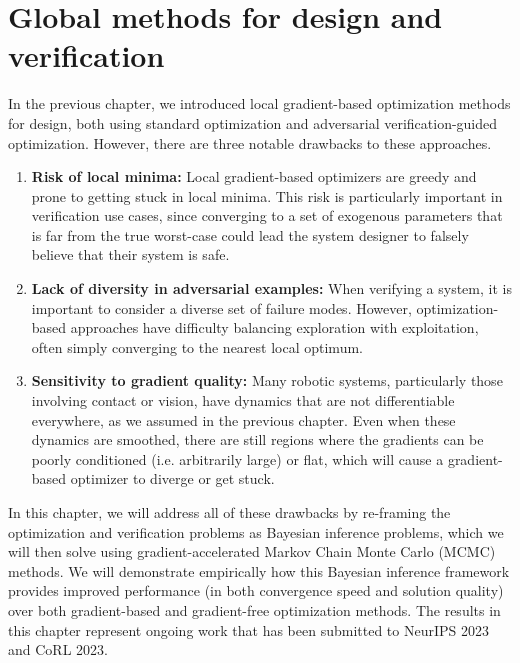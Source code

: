 \chapter{Global methods for design and verification}\label{section:global_methods}

In the previous chapter, we introduced local gradient-based optimization methods for design, both using standard optimization and adversarial verification-guided optimization. However, there are three notable drawbacks to these approaches.

\begin{enumerate}
    \item \textbf{Risk of local minima: } Local gradient-based optimizers are greedy and prone to getting stuck in local minima. This risk is particularly important in verification use cases, since converging to a set of exogenous parameters that is far from the true worst-case could lead the system designer to falsely believe that their system is safe.
    \item \textbf{Lack of diversity in adversarial examples: } When verifying a system, it is important to consider a diverse set of failure modes. However, optimization-based approaches have difficulty balancing exploration with exploitation, often simply converging to the nearest local optimum.
    \item \textbf{Sensitivity to gradient quality: } Many robotic systems, particularly those involving contact or vision, have dynamics that are not differentiable everywhere, as we assumed in the previous chapter. Even when these dynamics are smoothed, there are still regions where the gradients can be poorly conditioned (i.e. arbitrarily large) or flat, which will cause a gradient-based optimizer to diverge or get stuck.
\end{enumerate}

In this chapter, we will address all of these drawbacks by re-framing the optimization and verification problems as Bayesian inference problems, which we will then solve using gradient-accelerated Markov Chain Monte Carlo (MCMC) methods. We will demonstrate empirically how this Bayesian inference framework provides improved performance (in both convergence speed and solution quality) over both gradient-based and gradient-free optimization methods. The results in this chapter represent ongoing work that has been submitted to NeurIPS 2023 and CoRL 2023.


